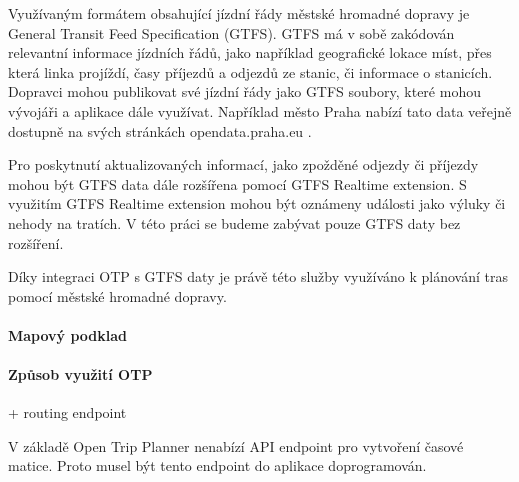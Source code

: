 \documentclass[thesis=M,czech]{FITthesis}[2019/12/23]
\theoremstyle{plain}
\theoremstyle{definition}
\begin{document}
Využívaným formátem obsahující jízdní řády městské hromadné dopravy je General Transit Feed Specification (GTFS)\cite{gtfs-spec}. GTFS má v sobě zakódován relevantní informace jízdních řádů, jako například geografické lokace míst, přes která linka projíždí, časy příjezdů a odjezdů ze stanic, či informace o stanicích. Dopravci mohou publikovat své jízdní řády jako GTFS soubory, které mohou vývojáři a aplikace dále využívat. Například město Praha nabízí tato data veřejně dostupně na svých stránkách opendata.praha.eu \cite{gtfs-prague}. 

Pro poskytnutí aktualizovaných informací, jako zpožděné odjezdy či příjezdy mohou být GTFS data dále rozšířena pomocí GTFS Realtime extension. S využitím GTFS Realtime extension mohou být oznámeny události jako výluky či nehody na tratích. V této práci se budeme zabývat pouze GTFS daty bez rozšíření.

Díky integraci OTP s GTFS daty je právě této služby využíváno k plánování tras pomocí městské hromadné dopravy.




\paragraph{Mapový podklad}



\paragraph{Způsob využití OTP}


+ routing endpoint


V základě Open Trip Planner nenabízí API endpoint pro vytvoření časové matice\cite{otp-api-spec}. Proto musel být tento endpoint do aplikace doprogramován.



\end{document}
